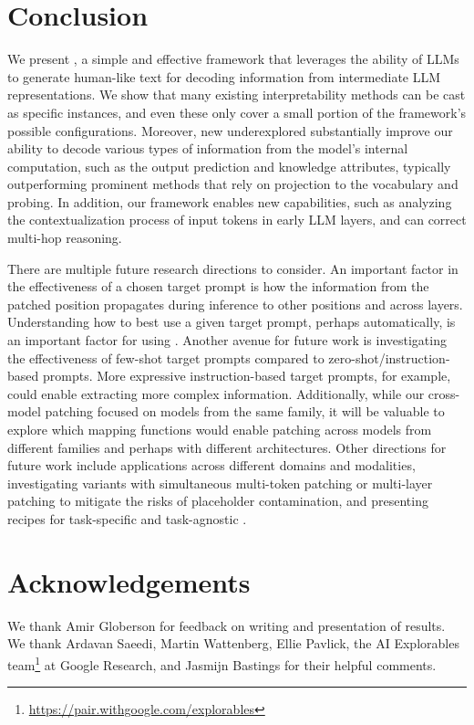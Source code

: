 \documentclass{article}
\theoremstyle{plain}
\theoremstyle{definition}
\theoremstyle{remark}
\begin{document}
\section{Conclusion}
\label{sec:conclusion}


We present \methodFamilyName{}, a simple and effective framework that leverages the ability of LLMs to generate human-like text for decoding information from intermediate LLM representations. 
We show that many existing interpretability methods can be cast as specific \methodName{} instances, and even these only cover a small portion of the framework's possible configurations. Moreover, new underexplored \methodNamePlural{} substantially improve our ability to decode various types of information from the model's internal computation, such as the output prediction and knowledge attributes, typically outperforming prominent methods that rely on projection to the vocabulary and probing.
In addition, our framework enables new capabilities, such as analyzing the contextualization process of input tokens in early LLM layers, and can correct multi-hop reasoning. 

There are multiple future research directions to consider. An important factor in the effectiveness of a chosen target prompt is how the information from the patched position propagates during inference to other positions and across layers. 
Understanding how to best use a given target prompt, perhaps automatically, is an important factor for using \methodNamePlural{}. Another avenue for future work is investigating the effectiveness of few-shot target prompts compared to zero-shot/instruction-based prompts. More expressive instruction-based target prompts, for example, could enable extracting more complex information. Additionally, while our cross-model patching focused on models from the same family, it will be valuable to explore which mapping functions would enable patching across models from different families and perhaps with different architectures. Other directions for future work include applications across different domains and modalities, investigating variants with simultaneous multi-token patching or multi-layer patching to mitigate the risks of placeholder contamination, and presenting recipes for task-specific and task-agnostic \methodNamePlural{}.


\section*{Acknowledgements}
We thank Amir Globerson for feedback on writing and presentation of results. We thank Ardavan Saeedi, Martin Wattenberg, Ellie Pavlick, the AI Explorables team\footnote{\url{https://pair.withgoogle.com/explorables}} at Google Research, and Jasmijn Bastings for their helpful comments.
\end{document}
